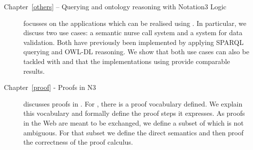 \begin{description}
\item[Chapter~\ref{others} -- Querying and ontology reasoning with Notation3 Logic]
focusses on the applications which can be realised using \nthreelogic. In particular, we discuss two use cases:
 a semantic nurse call system and a system for data validation. Both have  previously been implemented by 
applying SPARQL querying and OWL-DL reasoning. We show that both use cases can also be tackled with \nthree and that the implementations using \nthree
provide comparable results.
% 
% 
% 


\item[Chapter~\ref{proof} - Proofs in N3]
discusses proofs in \nthree.
For \nthree, there is a proof vocabulary defined. We explain this vocabulary and formally define the proof steps it expresses. 
As proofs in the Web are meant to be exchanged, we define a subset of \nthree which is not ambiguous. For that subset we define the direct semantics and then proof the 
correctness of the proof calculus.



\end{description}
